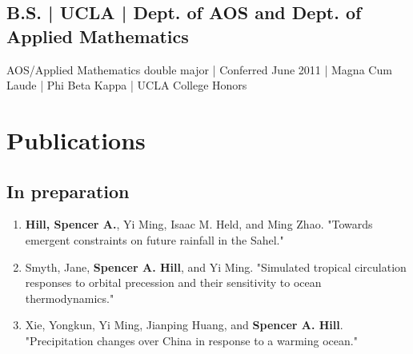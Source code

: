 \documentclass[12pt,letterpaper]{shillcv}
\begin{document}
\subsection*{B.S. | UCLA | Dept. of AOS and Dept. of Applied Mathematics}
\label{sec:orgdf5f762}
AOS/Applied Mathematics double major | Conferred June 2011 |
Magna Cum Laude | Phi Beta Kappa | UCLA College Honors
\section*{Publications}
\label{sec:org0cdfab2}
\subsection*{In preparation}
\label{sec:org9730cb4}
\begin{enumerate}
\item \textbf{Hill, Spencer A.}, Yi Ming, Isaac M. Held, and Ming Zhao.  "Towards emergent
constraints on future rainfall in the Sahel."
\item Smyth, Jane, \textbf{Spencer A. Hill}, and Yi Ming.  "Simulated tropical circulation
responses to orbital precession and their sensitivity to ocean
thermodynamics."
\item Xie, Yongkun, Yi Ming, Jianping Huang, and \textbf{Spencer A. Hill}.  "Precipitation
changes over China in response to a warming ocean."
\end{enumerate}
\end{document}

